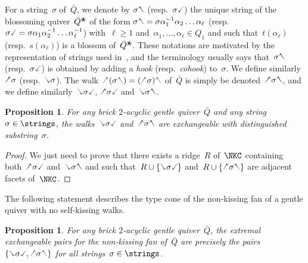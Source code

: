 \documentclass{amsart}
\newtheorem{proposition}[theorem]{Proposition}
\theoremstyle{definition}
\newcommand{\darkblue}{\color{darkblue}} %
\newcommand{\defn}[1]{\textsl{\darkblue #1}} %
\newcommand{\vincent}[1]{\todo[color=blue!30]{#1 \\ \hfill --- V.}}
\newcommand{\quiver}{\bar Q} %
\newcommand{\blossom}{^\text{\ding{96}}} %
\newcommand{\hL}{\text{\rotatebox[origin=c]{180}{\checked}}}
\newcommand{\hR}{\text{\rotatebox[origin=c]{180}{\reflectbox{\checked}}}}
\newcommand{\cL}{\text{\reflectbox{\checked}}}
\newcommand{\cR}{\text{\checked}}
\newcommand{\hh}[1]{\hL#1\hR} %
\newcommand{\cc}[1]{\cL#1\cR} %
\newcommand{\hc}[1]{\hL#1\cR} %
\newcommand{\ch}[1]{\cL#1\hR} %
\begin{document}
For a string~$\sigma$ of~$\quiver$, we denote by $\sigma\hR$ (resp.~$\sigma\cR$) the unique string of the blossoming quiver~$\quiver\blossom$ of the form $\sigma\hR = \sigma \alpha_1^{-1} \alpha_2 \dots \alpha_\ell$ (resp.~$\sigma\cR = \sigma \alpha_1 \alpha_2^{-1} \dots \alpha_\ell^{-1}$) with~$\ell \ge 1$ and~${\alpha_1, \dots, \alpha_\ell \in Q_1}$ and such that~$t(\alpha_\ell)$ (resp.~$s(\alpha_\ell)$) is a blossom of~$\quiver\blossom$.
These notations are motivated by the representation of strings used in~\cite{ButlerRingel, PaluPilaudPlamondon-nonkissing}, and the terminology usually says that~$\sigma\hR$ (resp.~$\sigma\cR$) is obtained by adding a \defn{hook} (resp.~\defn{cohook}) to~$\sigma$.
We define similarly~$\hL\sigma$ (resp.~$\cL\sigma$).
The walk~$\hL(\sigma\hR) = (\hL\sigma)\hR$ of~$\quiver$ is simply be denoted~$\hh{\sigma}$, and we define similarly~$\cc{\sigma}$, $\hc{\sigma}$ and~$\ch{\sigma}$.

\begin{proposition}
\label{prop:interestingExchangeablePairsNKC}
For any brick $2$-acyclic gentle quiver~$\quiver$ and any string~$\sigma \in \strings$, the walks~$\cc{\sigma}$ and~$\hh{\sigma}$ are exchangeable with distinguished substring~$\sigma$.
\end{proposition}

\begin{proof}
We just need to prove that there exists a ridge~$R$ of~$\NKC$ containing both~$\hc{\sigma}$ and~$\ch{\sigma}$ and such that~$R \cup \{\cc{\sigma}\}$ and~$R \cup \{\hh{\sigma}\}$ are adjacent facets of~$\NKC$.



\vincent{TODO}
\end{proof}

The following statement describes the type cone of the non-kissing fan of a gentle quiver with no self-kissing walks.

\begin{proposition}
\label{prop:extremalExchangeablePairsNKC}
For any brick $2$-acyclic gentle quiver~$\quiver$, the extremal exchangeable pairs for the non-kissing fan of~$\quiver$ are precisely the pairs~$\{\cc{\sigma}, \hh{\sigma}\}$ for all strings~$\sigma \in \strings$.
\end{proposition}
\end{document}
